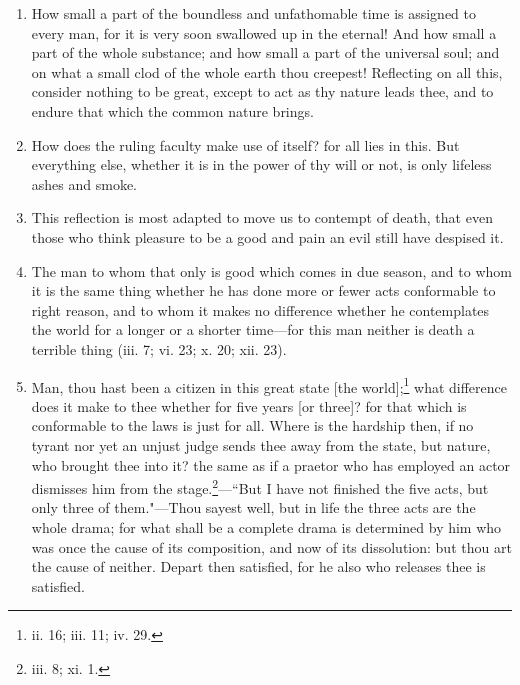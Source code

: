 \begin{enumerate}
\item How small a part of the boundless and unfathomable time is assigned to every man, for it is very soon swallowed up in the eternal! And how small a part of the whole substance; and how small a part of the universal soul; and on what a small clod of the whole earth thou creepest! Reflecting on all this, consider nothing to be great, except to act as thy nature leads thee, and to endure that which the common nature brings.

\item How does the ruling faculty make use of itself? for all lies in this. But everything else, whether it is in the power of thy will or not, is only lifeless ashes and smoke.

\item This reflection is most adapted to move us to contempt of death, that even those who think pleasure to be a good and pain an evil still have despised it.

\item The man to whom that only is good which comes in due season, and to whom it is the same thing whether he has done more or fewer acts conformable to right reason, and to whom it makes no difference whether he contemplates the world for a longer or a shorter time—for this man neither is death a terrible thing (iii. 7; vi. 23; x. 20; xii. 23).

\item Man, thou hast been a citizen in this great state [{\clarify the world}];\footnote{ii. 16; iii. 11; iv. 29.} what difference does it make to thee whether for five years [{\clarify or three}]? for that which is conformable to the laws is just for all. Where is the hardship then, if no tyrant nor yet an unjust judge sends thee away from the state, but nature, who brought thee into it? the same as if a praetor who has employed an actor dismisses him from the stage.\footnote{iii. 8; xi. 1.}—``But I have not finished the five acts, but only three of them."—Thou sayest well, but in life the three acts are the whole drama; for what shall be a complete drama is determined by him who was once the cause of its composition, and now of its dissolution: but thou art the cause of neither. Depart then satisfied, for he also who releases thee is satisfied.
\end{enumerate}